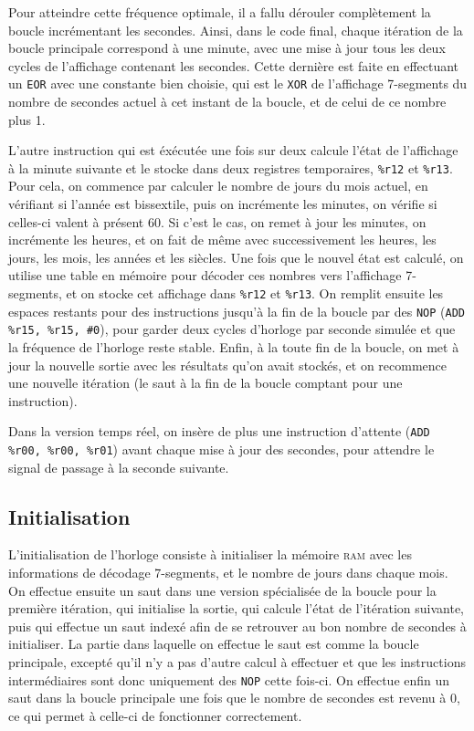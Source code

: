 \documentclass[11pt,a4paper]{article}
\begin{document}
Pour atteindre cette fréquence optimale, il a fallu dérouler
complètement la boucle incrémentant les secondes. Ainsi, dans le code
final, chaque itération de la boucle principale correspond à une
minute, avec une mise à jour tous les deux cycles de l'affichage
contenant les secondes. Cette dernière est faite en effectuant un
\verb!EOR! avec une constante bien choisie, qui est le \verb!XOR! de
l'affichage 7-segments du nombre de secondes actuel à cet instant de
la boucle, et de celui de ce nombre plus 1.

L'autre instruction qui est éxécutée une fois sur deux calcule l'état
de l'affichage à la minute suivante et le stocke dans deux registres
temporaires, \verb!%r12! et \verb!%r13!. Pour cela, on commence par
calculer le nombre de jours du mois actuel, en vérifiant si l'année
est bissextile, puis on incrémente les minutes, on vérifie si
celles-ci valent à présent 60. Si c'est le cas, on remet à jour les
minutes, on incrémente les heures, et on fait de même avec
successivement les heures, les jours, les mois, les années et les
siècles. Une fois que le nouvel état est calculé, on utilise une table
en mémoire pour décoder ces nombres vers l'affichage 7-segments, et on
stocke cet affichage dans \verb!%r12! et \verb!%r13!. On remplit
ensuite les espaces restants pour des instructions jusqu'à la fin de
la boucle par des \verb!NOP! (\verb!ADD %r15, %r15, #0!), pour garder
deux cycles d'horloge par seconde simulée et que la fréquence de
l'horloge reste stable. Enfin, à la toute fin de la boucle, on met à
jour la nouvelle sortie avec les résultats qu'on avait stockés, et on
recommence une nouvelle itération (le saut à la fin de la boucle
comptant pour une instruction).

Dans la version temps réel, on insère de plus une instruction
d'attente (\verb!ADD %r00, %r00, %r01!) avant chaque mise à jour des
secondes, pour attendre le signal de passage à la seconde suivante.

\subsection{Initialisation}

L'initialisation de l'horloge consiste à initialiser la mémoire
\textsc{ram} avec les informations de décodage 7-segments, et le
nombre de jours dans chaque mois. On effectue ensuite un saut dans une
version spécialisée de la boucle pour la première itération, qui
initialise la sortie, qui calcule l'état de l'itération suivante, puis
qui effectue un saut indexé afin de se retrouver au bon nombre de
secondes à initialiser. La partie dans laquelle on effectue le saut
est comme la boucle principale, excepté qu'il n'y a pas d'autre calcul
à effectuer et que les instructions intermédiaires sont donc
uniquement des \verb!NOP! cette fois-ci. On effectue enfin un saut
dans la boucle principale une fois que le nombre de secondes est
revenu à 0, ce qui permet à celle-ci de fonctionner correctement.
\end{document}
